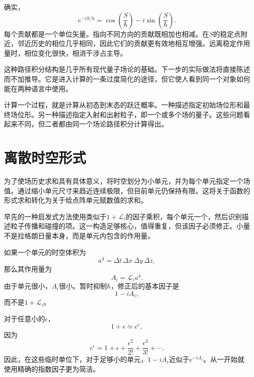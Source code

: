 确实，
\begin{equation}
e^{-iS/\hbar}
=
\cos\!\left(\frac{S}{\hbar}\right)
-i\sin\!\left(\frac{S}{\hbar}\right).
\end{equation}
每个贡献都是一个单位矢量。指向不同方向的贡献既相加也相减。在\(S\)的稳定点附近，邻近历史的相位几乎相同，因此它们的贡献更有效地相互增强。远离稳定作用量时，相位变化很快，相消干涉占主导。

这种路径积分结构是几乎所有现代量子场论的基础。下一步的实际做法将直接陈述而不加推导。它是进入计算的一条过度简化的途径，但它使人看到同一个对象如何能在两种语言中使用。

计算一个过程，就是计算从初态到末态的跃迁概率。一种描述指定初始场位形和最终场位形。另一种描述指定入射和出射粒子，即一个或多个场的量子。这些问题看起来不同，但二者都由同一个场论路径积分计算得出。

\section{离散时空形式}

为了使场历史求和具有具体意义，将时空划分为小单元，并为每个单元指定一个场值。通过缩小单元尺寸来趋近连续极限，但目前单元仍保持有限。这将关于函数的形式求和转化为关于给点阵单元赋数值的求和。

早先的一种启发式方法使用类似于\(1+\mathcal{L}_i\)的因子乘积，每个单元一个，然后识别描述粒子传播和碰撞的项。这一构造足够核心，值得重复，但该因子必须修正。小量不是拉格朗日量本身，而是单元内包含的作用量。

如果一个单元的时空体积为
\begin{equation}
a^4=\Delta t\,\Delta x\,\Delta y\,\Delta z,
\end{equation}
那么其作用量为
\begin{equation}
A_i=\mathcal{L}_i a^4.
\end{equation}
由于单元很小，\(A_i\)很小。暂时抑制\(\hbar\)，修正后的基本因子是
\begin{equation}
1-iA_i,
\end{equation}
而不是\(1+\mathcal{L}_i\)。

对于任意小的\(\epsilon\)，
\begin{equation}
1+\epsilon\simeq e^\epsilon,
\end{equation}
因为
\begin{equation}
e^\epsilon
=1+\epsilon+\frac{\epsilon^2}{2!}
+\frac{\epsilon^3}{3!}+\cdots.
\end{equation}
因此，在这些临时单位下，对于足够小的单元，\(1-iA_i\)近似于\(e^{-iA_i}\)。从一开始就使用精确的指数因子更为简洁。

